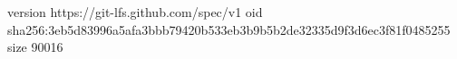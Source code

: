 version https://git-lfs.github.com/spec/v1
oid sha256:3eb5d83996a5afa3bbb79420b533eb3b9b5b2de32335d9f3d6ec3f81f0485255
size 90016
